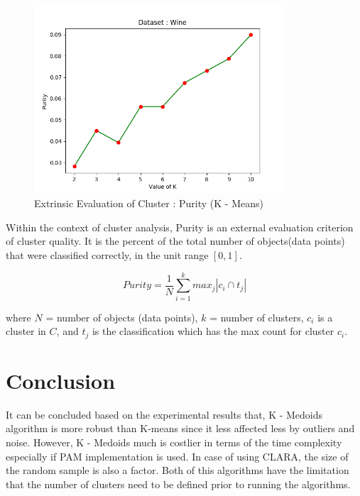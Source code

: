 \documentclass[12pt]{article}
\begin{document}
\begin{figure}[H]
	\centering
	\includegraphics[width = 0.75\linewidth, height = 7cm]{eval_wine.png}
	\caption{Extrinsic Evaluation of Cluster : Purity (K - Means)}
	\label{fig:eval_credit}
\end{figure}


Within the context of cluster analysis, Purity is an external evaluation criterion of cluster quality. It is the percent of the total number of objects(data points) that were classified correctly, in the unit range $ [0, 1] $.

\begin{equation}
Purity = \frac 1 N \sum_{i=1}^k max_j | c_i \cap t_j |
\end{equation}

where $ N $ = number of objects (data points), $ k $ = number of clusters, $ c_i $ is a cluster in $ C $, and $ t_j $ is the classification which has the max count for cluster $ c_i $.

\section{Conclusion}
It can be concluded based on the experimental results that, K - Medoids algorithm is more robust than K-means since it less affected less by outliers and noise. However, K - Medoids much is costlier in terms of the time complexity especially if PAM implementation is used. In case of using CLARA, the size of the random sample is also a factor. Both of this algorithms have the limitation that the number of clusters need to be defined prior to running the algorithms.
\end{document}
